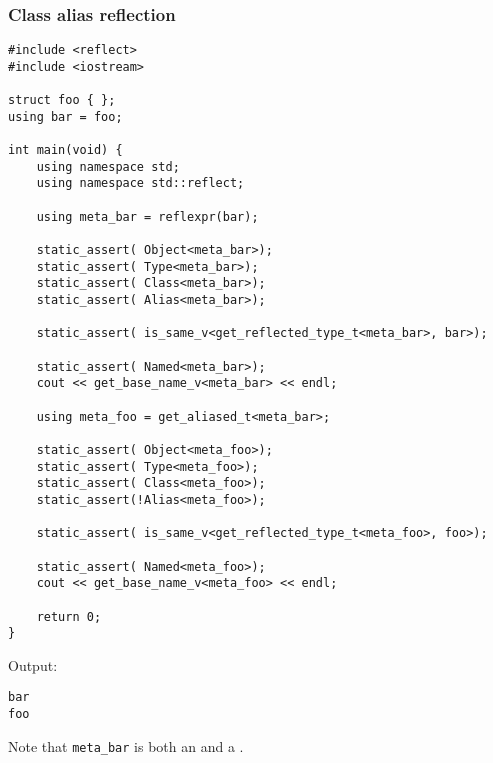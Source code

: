 \subsubsection{Class alias reflection}

\begin{verbatim}
#include <reflect>
#include <iostream>

struct foo { };
using bar = foo;

int main(void) {
	using namespace std;
	using namespace std::reflect;

	using meta_bar = reflexpr(bar);

	static_assert( Object<meta_bar>);
	static_assert( Type<meta_bar>);
	static_assert( Class<meta_bar>);
	static_assert( Alias<meta_bar>);

	static_assert( is_same_v<get_reflected_type_t<meta_bar>, bar>);

	static_assert( Named<meta_bar>);
	cout << get_base_name_v<meta_bar> << endl;

	using meta_foo = get_aliased_t<meta_bar>;

	static_assert( Object<meta_foo>);
	static_assert( Type<meta_foo>);
	static_assert( Class<meta_foo>);
	static_assert(!Alias<meta_foo>);

	static_assert( is_same_v<get_reflected_type_t<meta_foo>, foo>);

	static_assert( Named<meta_foo>);
	cout << get_base_name_v<meta_foo> << endl;

	return 0;
}
\end{verbatim}

Output:

\begin{verbatim}
bar
foo
\end{verbatim}

Note that \texttt{meta\_bar} is both an  and a .

